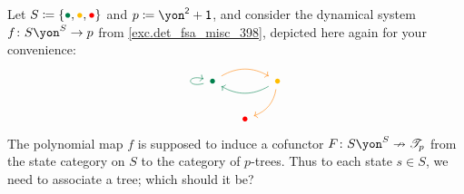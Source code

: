 \documentclass[Book-Poly]{subfiles}
\begin{document}
\begin{example}\label{ex.cofree_dyn_sys}
Let $S\coloneqq\{\bul[dgreen],\bul[dyellow],\bul[red]\}$ and $p\coloneqq\yon^\2+\1$, and consider the dynamical system $f\colon S\yon^S\to p$ from \cref{exc.det_fsa_misc_398}, depicted here again for your convenience:
\[
\begin{tikzcd}[column sep=small]
	\bul[dgreen]\ar[rr, bend left, orange]\ar[loop left, dgreen]&&
	\bul[dyellow]\ar[dl, bend left, orange]\ar[ll, dgreen, bend left]\\&
	\bul[red]
\end{tikzcd}
\]
The polynomial map $f$ is supposed to induce a cofunctor $F\colon S\yon^S\cof\cofree{p}$ from the state category on $S$ to the category of $p$-trees. Thus to each state $s\in S$, we need to associate a tree; which should it be? 
\end{example}



\end{document}
